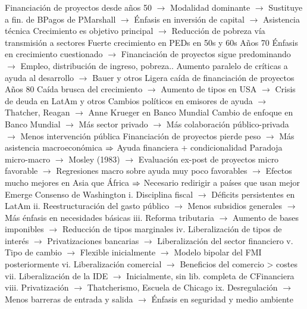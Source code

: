 \documentclass{nuevotema}
\begin{document}
\begin{esquemal}
				\4[] Financiación de proyectos desde años 50
				\4[] $\to$ Modalidad dominante
				\4[] $\to$ Sustituye a fin. de BPagos de PMarshall
				\4[] $\to$ Énfasis en inversión de capital
				\4[] $\to$ Asistencia técnica
				\4[] Crecimiento es objetivo principal
				\4[] $\to$ Reducción de pobreza vía transmisión a sectores
				\4[] Fuerte crecimiento en PEDs en 50s y 60s
				\4 Años 70
				\4[] Énfasis en crecimiento cuestionado
				\4[] $\to$ Financiación de proyectos sigue predominando
				\4[] $\to$ Empleo, distribución de ingreso, pobreza..
				\4[] Aumento paralelo de críticas a ayuda al desarrollo
				\4[] $\to$ Bauer y otros
				\4[] Ligera caída de financiación de proyectos
				\4 Años 80
				\4[] Caída brusca del crecimiento
				\4[] $\to$ Aumento de tipos en USA
				\4[] $\to$ Crisis de deuda en LatAm y otros
				\4[] Cambios políticos en emisores de ayuda
				\4[] $\to$ Thatcher, Reagan
				\4[] $\to$ Anne Krueger en Banco Mundial
				\4[] Cambio de enfoque en Banco Mundial
				\4[] $\to$ Más sector privado
				\4[] $\to$ Más colaboración público-privada
				\4[] $\to$ Menos intervención pública
				\4[] Financiación de proyectos pierde peso
				\4[] $\to$ Más asistencia macroeconómica
				\4[] $\Rightarrow$ Ayuda financiera + condicionalidad
				\4[] Paradoja micro-macro
				\4[] $\to$ Mosley (1983)
				\4[] $\to$ Evaluación ex-post de proyectos micro favorable
				\4[] $\to$ Regresiones macro sobre ayuda muy poco favorables
				\4[] $\to$ Efectos mucho mejores en Asia que África
				\4[] $\Rightarrow$ Necesario redirigir a países que usan mejor
				\4[] Emerge Consenso de Washington
				\4[] i. Disciplina fiscal
				\4[] $\to$ Déficits persistentes en LatAm
				\4[] ii. Reestructuración del gasto público
				\4[] $\to$ Menos subsidios generales
				\4[] $\to$ Más énfasis en necesidades básicas
				\4[] iii. Reforma tributaria
				\4[] $\to$ Aumento de bases imponibles
				\4[] $\to$ Reducción de tipos marginales
				\4[] iv. Liberalización de tipos de interés
				\4[] $\to$ Privatizaciones bancarias
				\4[] $\to$ Liberalización del sector financiero
				\4[] v. Tipo de cambio
				\4[] $\to$ Flexible inicialmente
				\4[] $\to$ Modelo bipolar del FMI posteriormente
				\4[] vi. Liberalización comercial
				\4[] $\to$ Beneficios del comercio > costes
				\4[] vii. Liberalización de la IDE
				\4[] $\to$ Inicialmente, sin lib. completa de CFinanciera
				\4[] viii. Privatización
				\4[] $\to$ Thatcherismo, Escuela de Chicago
				\4[] ix. Desregulación
				\4[] $\to$ Menos barreras de entrada y salida
				\4[] $\to$ Énfasis en seguridad y medio ambiente

\end{esquemal}
\end{document}
